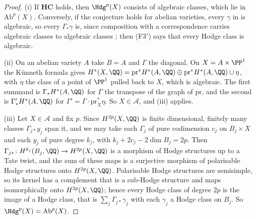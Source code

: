 \begin{proof}
(i) If $\mathbf{HC}$ holds, then $\Hdg^{p}(X)$ consists of algebraic classes,
which lie in $\mathrm{Ab}^{p}(X)$. Conversely, if the conjecture holds for
abelian varieties, every $\gamma$ in  is algebraic, so
every $\Gamma_{*}\gamma$ is, since composition with a correspondence carries
algebraic classes to algebraic classes \cite[Chapter~16]{Ful98}; then
\textup{(F3$'$)} says that every Hodge class is algebraic.

(ii) On an abelian variety $A$ take $B=A$ and $\Gamma$ the diagonal. On
$X=A\times\PP^{1}$ the K\"unneth formula gives
$H^{*}(X,\QQ)=\mathrm{pr}^{*}H^{*}(A,\QQ)\oplus
\mathrm{pr}^{*}H^{*}(A,\QQ)\cup\eta$, with $\eta$ the class of a point of
$\PP^{1}$ pulled back to $X$, which is algebraic. The first summand is
$\Gamma_{*}H^{*}(A,\QQ)$ for $\Gamma$ the transpose of the graph of
$\mathrm{pr}$, and the second is $\Gamma'_{*}H^{*}(A,\QQ)$ for
$\Gamma'=\Gamma\cdot\mathrm{pr}_{X}^{*}\eta$. So $X\in\mathcal{A}$, and
(iii) applies.

(iii) Let $X\in\mathcal{A}$ and fix $p$. Since $H^{2p}(X,\QQ)$ is finite
dimensional, finitely many classes $\Gamma_{j*}y_{j}$ span it, and we may
take each $\Gamma_{j}$ of pure codimension $c_{j}$ on $B_{j}\times X$ and each
$y_{j}$ of pure degree $k_{j}$, with $k_{j}+2c_{j}-2\dim B_{j}=2p$. Then
$\Gamma_{j*}\colon H^{k_{j}}(B_{j},\QQ)\to H^{2p}(X,\QQ)$ is a morphism of
Hodge structures up to a Tate twist, and the sum of these maps is a
surjective morphism of polarisable Hodge structures onto $H^{2p}(X,\QQ)$.
Polarisable Hodge structures are semisimple, so its kernel has a complement
that is a sub-Hodge structure and maps isomorphically onto $H^{2p}(X,\QQ)$;
hence every Hodge class of degree $2p$ is the image of a Hodge class, that is
$\sum_{j}\Gamma_{j*}\gamma_{j}$ with each $\gamma_{j}$ a Hodge class on
$B_{j}$. So $\Hdg^{p}(X)=\mathrm{Ab}^{p}(X)$.


\end{proof}

